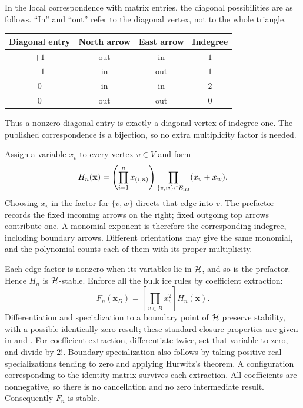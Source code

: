 \documentclass[11pt,letterpaper]{article}
\theoremstyle{remark}\newtheorem{remark}[theorem]{Remark}
\begin{document}
In the local correspondence with matrix entries, the diagonal
possibilities are as follows. ``In'' and ``out'' refer to the diagonal
vertex, not to the whole triangle.
\begin{center}
\begin{tabular}{cccc}
\toprule
Diagonal entry & North arrow & East arrow & Indegree\\
\midrule
$+1$ & out & in & $1$\\
$-1$ & in & out & $1$\\
$0$ & in & in & $2$\\
$0$ & out & out & $0$\\
\bottomrule
\end{tabular}
\end{center}
Thus a nonzero diagonal entry is exactly a diagonal vertex of indegree
one. The published correspondence is a bijection, so no extra
multiplicity factor is needed.

Assign a variable $x_v$ to every vertex $v\in V$ and form
\begin{equation}\label{dsasm:log:orientation}
 H_n(\mathbf x)=\left(\prod_{i=1}^n x_{(i,n)}\right)
             \prod_{\{v,w\}\in E_{\rm int}}(x_v+x_w).
\end{equation}
Choosing $x_v$ in the factor for $\{v,w\}$ directs that edge into $v$.
The prefactor records the fixed incoming arrows on the right;
fixed outgoing top arrows contribute one. A monomial exponent is
therefore the corresponding indegree, including boundary arrows.
Different orientations may give the same monomial, and the polynomial
counts each of them with its proper multiplicity.

Each edge factor is nonzero when its variables lie in $\mathcal H$, and so
is the prefactor. Hence $H_n$ is $\mathcal H$-stable. Enforce all the bulk ice
rules by coefficient extraction:
\begin{equation}\label{dsasm:log:extract}
 F_n(\mathbf x_D)=\left[\prod_{v\in B}x_v^2\right]H_n(\mathbf x).
\end{equation}
Differentiation and specialization to a boundary point of $\mathcal H$
preserve stability, with a possible identically zero result; these
standard closure properties are given in
\cite[Theorem 1.6 and Lemma 1.7]{bb1} and
\cite[Remark 3.1]{bb2}. For coefficient extraction, differentiate
twice, set that variable to zero, and divide by $2!$. Boundary
specialization also follows by taking positive real specializations
tending to zero and applying Hurwitz's theorem. A configuration
corresponding to the identity matrix survives each extraction.
All coefficients are nonnegative, so there is no cancellation and
no zero intermediate result. Consequently $F_n$ is stable.
\end{document}
